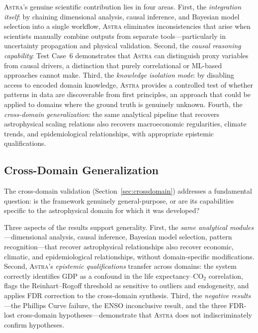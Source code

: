 \documentclass[usenatbib]{rasti}
\newcommand{\astra}{\textsc{Astra}\xspace}
\begin{document}
\astra's genuine scientific contribution lies in four areas.
First, the \emph{integration itself}: by chaining dimensional analysis, causal inference, and Bayesian model selection into a single workflow, \astra eliminates inconsistencies that arise when scientists manually combine outputs from separate tools---particularly in uncertainty propagation and physical validation.
Second, the \emph{causal reasoning capability}: Test Case~6 demonstrates that \astra can distinguish proxy variables from causal drivers, a distinction that purely correlational or ML-based approaches cannot make.
Third, the \emph{knowledge isolation mode}: by disabling access to encoded domain knowledge, \astra provides a controlled test of whether patterns in data are discoverable from first principles, an approach that could be applied to domains where the ground truth is genuinely unknown.
Fourth, the \emph{cross-domain generalization}: the same analytical pipeline that recovers astrophysical scaling relations also recovers macroeconomic regularities, climate trends, and epidemiological relationships, with appropriate epistemic qualifications.

\subsection{Cross-Domain Generalization}
\label{sec:discussion:crossdomain}

The cross-domain validation (Section~\ref{sec:crossdomain}) addresses a fundamental question: is the framework genuinely general-purpose, or are its capabilities specific to the astrophysical domain for which it was developed?

Three aspects of the results support generality.
First, the \emph{same analytical modules}---dimensional analysis, causal inference, Bayesian model selection, pattern recognition---that recover astrophysical relationships also recover economic, climatic, and epidemiological relationships, without domain-specific modifications.
Second, \astra's \emph{epistemic qualifications} transfer across domains: the system correctly identifies GDP as a confound in the life expectancy--CO$_{2}$ correlation, flags the Reinhart--Rogoff threshold as sensitive to outliers and endogeneity, and applies FDR correction to the cross-domain synthesis.
Third, the \emph{negative results}---the Phillips Curve failure, the ENSO inconclusive result, and the three FDR-lost cross-domain hypotheses---demonstrate that \astra does not indiscriminately confirm hypotheses.
\end{document}

